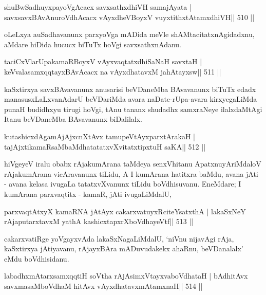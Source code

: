 \begin{shl}
shuBwSadhuyxpayoVgAcacx savxsathxdhiVH samajAyata |
savxsavxBAvAnuroVdhAcacx vAyxdheVBoyxV vuyxtithxtAtamxdhiVH\hfill || 510 ||
\end{shl}

\begin{artha}
oLeLxya auSadhavanunx parxyoVga mADida meVle shAMtacitatxnAgidadxnu, aMdare hiDida hucucx biTuTx hoVgi savxsathxnAdanu.
\end{artha}

\begin{shl}
taciCxVlarUpakamaRBoyxV vAyxvaqtatxdhiSaNaH savxtaH |
keVvalasamxqqtayxBAvAcacx na vAyxdhatavxM ja{hA}tayxsw\hfill || 511 ||
\end{shl}

\begin{artha}
kaSxtirxya savxBAvavanunx anusarisi beVDaneMba BAvavanunx biTuTx edadx manasusxLaLxvanAdarU beVDariMda avara naDate-rUpa-avara kirxyegaLiMda punaH budidhxyu tirugi hoVgi, tAnu tananx shudadhx samxraNeye ilalxdaMtAgi Itanu beVDaneMba BAvavanunx biDalilalx.
\end{artha}

\begin{shl}
kutashicxdAgamAjAjxcnXtAvx tamupeVtAyxparxtArakaH |
tajAjxtikamaRsaMbaMdhatatatxvXvitatxtipxtuH saKA\hfill || 512 ||
\end{shl}

\begin{artha}
hiVgeyeV iralu obabx rAjakumArana taMdeya
senxVhitanu Apatxnu\break yAriMdaloV rAjakumArana vicAravanunx tiLidu, A I
kumArana hatitxra baMdu, avana jAti - avana kelasa ivugaLa
tatatxvXvanunx tiLidu boVdhisuvanu. EneMdare; I kumArana parxvaqtitx -
kamaR, jAti ivugaLiMdalU,  
\end{artha}

\begin{shl}
parxvaqtAtxyX kamaRNA jAtAyx cakarxvatuyxRciteYsatxthA |
lakaSxNeY rAjaputarxtavxM yathA kashicxtapxrXboVdhayeVtf\hfill || 513 ||
\end{shl}

\begin{artha}
cakarxvatiRge yoVgayxvAda lakaSxNagaLiMdalU, `niVnu nijavAgi rAja, kaSxtirxya jAtiyavanu, rAjayxBAra mADuvudakekx ahaRnu, beVDanalalx' eMdu boVdhisidanu.
\end{artha}

\begin{shl}
labadhxmAtarxsamxqqtiH soV\s tha rAjA\s simxVtayxvaboVdhataH |
bAdhitAvx savxmasaMboVdhaM hitAvx vAyxdhatavxmAtamxnaH\hfill || 514 ||
\end{shl}

